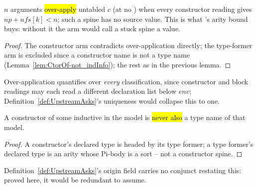 \begin{lemma}
\label{lem:overapplied_ctor_not_value}
\leanok
{}
 $n$ arguments \hl{over-apply} untabled $c$ (at no ) when every
constructor reading gives $np+nfs[k] < n$; such a spine has no source value.
 This is what 's arity bound buys: without it the arm would call a stuck
spine a value.
\end{lemma}
\begin{proof}
\leanok
{}
 The constructor arm contradicts over-application directly; the type-former arm is
excluded since a constructor name is not a type name (Lemma~\ref{lem:CtorOf-not_indInfo}); the
rest as in the previous lemma.
\end{proof}

\begin{remark}
 Over-application quantifies over \emph{every} classification, since constructor and
block readings may each read a different declaration list below $env$;
Definition~\ref{def:UpstreamAsks}'s uniqueness would collapse this to one.
\end{remark}

\begin{lemma}
\label{lem:CtorOf-not_indInfo}
\leanok
{}
 A constructor of some inductive in the model is \hl{never also} a type name of
that model.
\end{lemma}
\begin{proof}
\leanok
{}
 A constructor's declared type is headed by its type former; a type former's declared
type is an arity whose Pi-body is a sort -- not a constructor spine.
\end{proof}

\begin{remark}
 Definition~\ref{def:UpstreamAsks}'s origin field carries no conjunct restating this:
proved here, it would be redundant to assume.
\end{remark}


